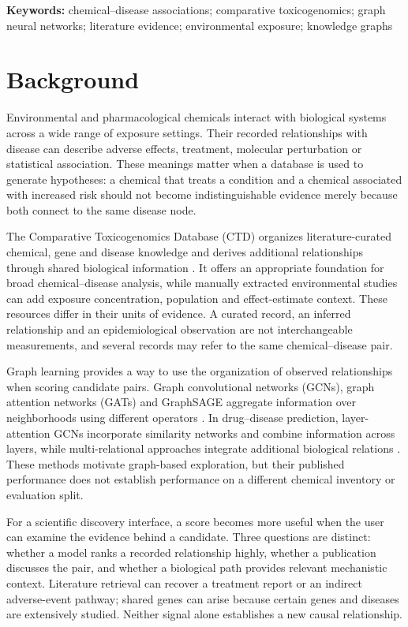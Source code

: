 \noindent\textbf{Keywords:} chemical--disease associations; comparative toxicogenomics; graph neural networks; literature evidence; environmental exposure; knowledge graphs

\section{Background}
Environmental and pharmacological chemicals interact with biological systems across a wide range of exposure settings. Their recorded relationships with disease can describe adverse effects, treatment, molecular perturbation or statistical association. These meanings matter when a database is used to generate hypotheses: a chemical that treats a condition and a chemical associated with increased risk should not become indistinguishable evidence merely because both connect to the same disease node.

The Comparative Toxicogenomics Database (CTD) organizes literature-curated chemical, gene and disease knowledge and derives additional relationships through shared biological information \citep{ctd2025}. It offers an appropriate foundation for broad chemical--disease analysis, while manually extracted environmental studies can add exposure concentration, population and effect-estimate context. These resources differ in their units of evidence. A curated record, an inferred relationship and an epidemiological observation are not interchangeable measurements, and several records may refer to the same chemical--disease pair.

Graph learning provides a way to use the organization of observed relationships when scoring candidate pairs. Graph convolutional networks (GCNs), graph attention networks (GATs) and GraphSAGE aggregate information over neighborhoods using different operators \citep{gcn,gat,graphsage}. In drug--disease prediction, layer-attention GCNs incorporate similarity networks and combine information across layers, while multi-relational approaches integrate additional biological relations \citep{lagcn,mrdda}. These methods motivate graph-based exploration, but their published performance does not establish performance on a different chemical inventory or evaluation split.

For a scientific discovery interface, a score becomes more useful when the user can examine the evidence behind a candidate. Three questions are distinct: whether a model ranks a recorded relationship highly, whether a publication discusses the pair, and whether a biological path provides relevant mechanistic context. Literature retrieval can recover a treatment report or an indirect adverse-event pathway; shared genes can arise because certain genes and diseases are extensively studied. Neither signal alone establishes a new causal relationship.

